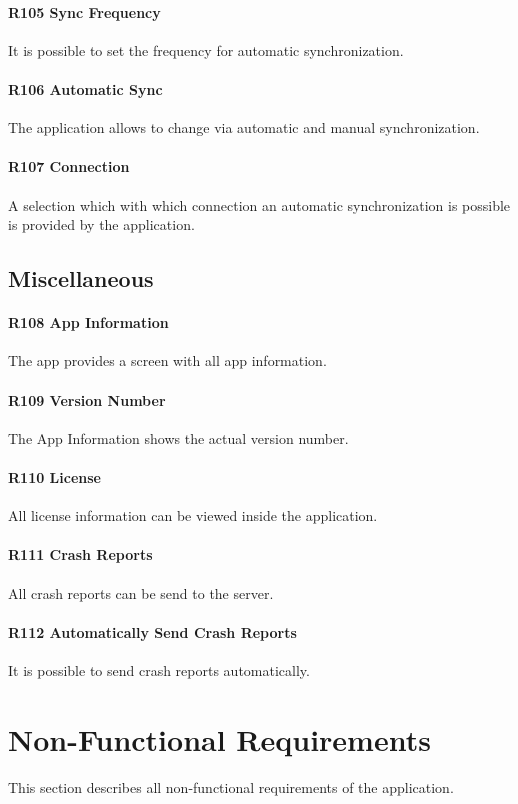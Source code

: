 \paragraph{R105 Sync Frequency}
It is possible to set the frequency for automatic synchronization.
\paragraph{R106 Automatic Sync}
The application allows to change via automatic and manual synchronization.
\paragraph{R107 Connection}
A selection which with which connection an automatic synchronization is possible is provided by the application.

\subsection{Miscellaneous}
\paragraph{R108 App Information}
The app provides a screen with all app information.
\paragraph{R109 Version Number}
The App Information shows the actual version number.
\paragraph{R110 License}
All license information can be viewed inside the application.
\paragraph{R111 Crash Reports}
All crash reports can be send to the server.
\paragraph{R112 Automatically Send Crash Reports}
It is possible to send crash reports automatically.

\section{Non-Functional Requirements}
This section describes all non-functional requirements of the application.
